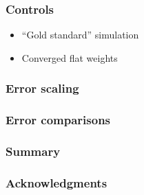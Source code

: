\documentclass{beamer}
\let\olditem\item
\renewcommand{\item}{\setlength{\itemsep}{6pt}\olditem}
\begin{document}
\begin{frame}
  \frametitle{Controls}
  \begin{itemize}
  \item ``Gold standard'' simulation
  \item Converged flat weights
  \end{itemize}
\end{frame}

\begin{frame}
  \frametitle{Error scaling}
\end{frame}

\begin{frame}
  \frametitle{Error comparisons}
\end{frame}

\begin{frame}
  \frametitle{Summary}
\end{frame}

\begin{frame}
  \frametitle{Acknowledgments}
\end{frame}
\end{document}
